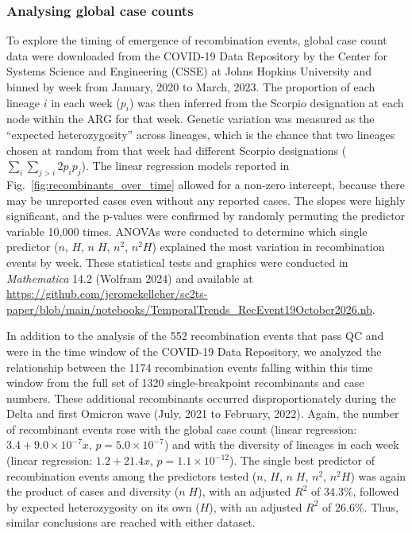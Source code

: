 \documentclass[12pt]{article}
\newcommand{\figref}[1]{Fig.~\ref{#1}}
\begin{document}
\subsubsection*{Analysing global case counts}
To explore the timing of emergence of recombination events,
global case count data were downloaded from
the COVID-19 Data Repository by the Center
for Systems Science and Engineering (CSSE)
at Johns Hopkins University \cite{Dong2020} and
binned by week from January, 2020 to March, 2023.
The proportion of each lineage $i$ in each week ($p_i$)
was then inferred from the Scorpio designation
at each node within the ARG for that week.
Genetic variation was measured
as the ``expected heterozygosity'' across lineages,
which is the chance that two lineages chosen at random
from that week had different Scorpio designations
($\sum_{i} \sum_{j>i} 2 p_i p_j$).
The linear regression models reported in
\figref{fig:recombinants_over_time}
allowed for a non-zero intercept,
because there may be unreported cases even without any reported cases.
The slopes were highly significant, and
the p-values were confirmed
by randomly permuting the predictor variable 10,000 times.
ANOVAs were conducted to determine which single predictor
($n$, $H$, $n \; H$, $n^2$, $n^2 H$)
explained the most variation in recombination events by week.
These statistical tests and graphics were conducted
in \textit{Mathematica} 14.2 (Wolfram 2024) and
available at
\url{https://github.com/jeromekelleher/sc2ts-paper/blob/main/notebooks/TemporalTrends\_RecEvent19October2026.nb}.

In addition to the analysis of the 552 recombination events that pass QC and were in the time window of the COVID-19 Data Repository,
we analyzed the relationship between the 1174 recombination events falling within this time window from the full set of 1320 single-breakpoint recombinants and case numbers.
These additional recombinants occurred disproportionately
during the Delta and first Omicron wave (July, 2021 to February, 2022).
Again, the number of recombinant events rose with the global case count
(linear regression: $3.4 + 9.0\times10^{-7} x$, $p = 5.0\times10^{-7}$)
and with the diversity of lineages in each week
(linear regression: $1.2 + 21.4 x$, $p = 1.1\times10^{-12}$).
The single best predictor of recombination events
among the predictors tested ($n$, $H$, $n \; H$, $n^2$, $n^2 H$)
was again the product of cases and diversity ($n \; H$),
with an adjusted $R^2$ of 34.3\%,
followed by expected heterozygosity on its own ($H$),
with an adjusted $R^2$ of 26.6\%.
Thus, similar conclusions are reached with either dataset.
\end{document}
